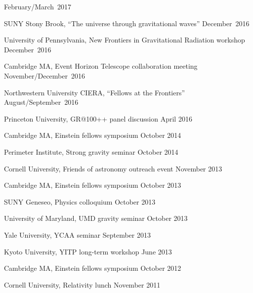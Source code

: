 \begin{etaremune}
  \hfill{}
  February/March~2017
\item
  SUNY Stony Brook,
  ``The universe through gravitational waves''
  \hfill{}
  December~2016
\item
  University of Pennsylvania,
  New Frontiers in Gravitational Radiation workshop
  \hfill{}
  December~2016
\item
  Cambridge MA,
  Event Horizon Telescope collaboration meeting
  \hfill{}
  November/December~2016
\item
  Northwestern University CIERA,
  ``Fellows at the Frontiers''
  \hfill{}
  August/September~2016
\item
  Princeton University,
  GR@100++ panel discussion
  \hfill{}
  April 2016
\item
  Cambridge MA,
  Einstein fellows symposium
  \hfill{}
  October 2014
\item
  Perimeter Institute,
  Strong gravity seminar
  \hfill{}
  October 2014
\item
  Cornell University,
  Friends of astronomy outreach event
  \hfill{}
  November 2013
\item
  Cambridge MA,
  Einstein fellows symposium
  \hfill{}
  October 2013
\item
  SUNY Geneseo,
  Physics colloquium
  \hfill{}
  October 2013
\item
  University of Maryland,
  UMD gravity seminar
  \hfill{}
  October 2013
\item
  Yale University,
  YCAA seminar
  \hfill{}
  September 2013
\item
  Kyoto University,
  YITP long-term workshop
  \hfill{}
  June 2013
\item
  Cambridge MA,
  Einstein fellows symposium
  \hfill{}
  October 2012
\item
  Cornell University,
  Relativity lunch
  \hfill{}
  November 2011
\end{etaremune}

